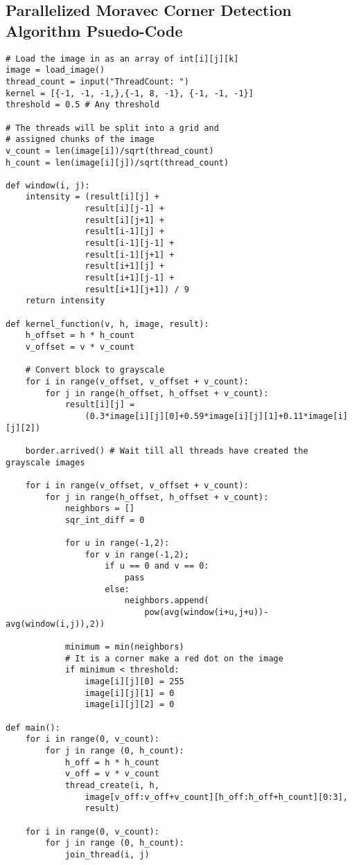 \documentclass{article}
\begin{document}
        \subsection{Parallelized Moravec Corner Detection Algorithm Psuedo-Code}
                \begin{lstlisting}
# Load the image in as an array of int[i][j][k]
image = load_image()
thread_count = input("ThreadCount: ")
kernel = [{-1, -1, -1,},{-1, 8, -1}, {-1, -1, -1}]
threshold = 0.5 # Any threshold

# The threads will be split into a grid and 
# assigned chunks of the image
v_count = len(image[i])/sqrt(thread_count)
h_count = len(image[i][j])/sqrt(thread_count)

def window(i, j):
    intensity = (result[i][j] + 
                result[i][j-1] + 
                result[i][j+1] +
                result[i-1][j] + 
                result[i-1][j-1] + 
                result[i-1][j+1] +
                result[i+1][j] + 
                result[i+1][j-1] + 
                result[i+1][j+1]) / 9
    return intensity

def kernel_function(v, h, image, result):
    h_offset = h * h_count
    v_offset = v * v_count
    
    # Convert block to grayscale
    for i in range(v_offset, v_offset + v_count):
        for j in range(h_offset, h_offset + v_count):
            result[i][j] = 
                (0.3*image[i][j][0]+0.59*image[i][j][1]+0.11*image[i][j][2])
    
    border.arrived() # Wait till all threads have created the grayscale images
    
    for i in range(v_offset, v_offset + v_count):
        for j in range(h_offset, h_offset + v_count):
            neighbors = []
            sqr_int_diff = 0
            
            for u in range(-1,2):   
                for v in range(-1,2);
                    if u == 0 and v == 0:
                        pass
                    else:
                        neighbors.append(
                            pow(avg(window(i+u,j+u))-avg(window(i,j)),2))
            
            minimum = min(neighbors)
            # It is a corner make a red dot on the image
            if minimum < threshold:
                image[i][j][0] = 255
                image[i][j][1] = 0
                image[i][j][2] = 0

def main():
    for i in range(0, v_count):
        for j in range (0, h_count):
            h_off = h * h_count
            v_off = v * v_count
            thread_create(i, h, 
                image[v_off:v_off+v_count][h_off:h_off+h_count][0:3], 
                result)
                
    for i in range(0, v_count):
        for j in range (0, h_count):
            join_thread(i, j)

        \end{lstlisting}
        \pagebreak
\end{document}
